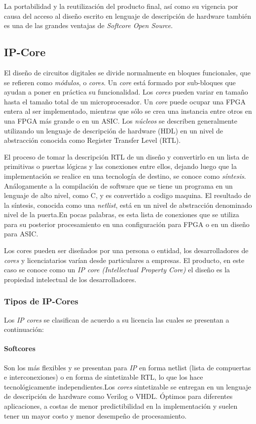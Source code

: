 	La portabilidad y la reutilización del producto final, así como su vigencia por causa del acceso al diseño escrito en lenguaje de descripción de
	hardware también es una de las grandes ventajas de \textit{Softcore Open Source}.

	\subsection{IP-Core}
	El diseño de circuitos digitales se divide normalmente en bloques funcionales, que se refieren como \textit{módulos}, o \textit{cores}. Un
	\textit{core} está formado por sub-bloques que ayudan a poner en práctica su funcionalidad. Los \textit{cores} pueden variar en tamaño hasta el
	tamaño total de un microprocesador. Un \textit{core} puede ocupar una FPGA entera al ser implementado, mientras que sólo se crea una instancia entre
	otros en una FPGA más grande o en un ASIC. Los \textit{núcleos} se describen generalmente utilizando un lenguaje de descripción de hardware (HDL) en
	un nivel de abstracción conocida como Register Transfer Level (RTL).
	
	El proceso de tomar la descripción RTL de un diseño y convertirlo en un lista de primitivas o puertas lógicas y las conexiones entre ellos, dejando
	luego que la  implementación se realice en una tecnología de destino, se conoce como \textit{síntesis}. Análogamente a la compilación de software	que
	se tiene un programa en un lenguaje de alto nivel, como C, y  es convertido a codigo maquina. El resultado de la síntesis, conocida como una
	\textit{netlist}, está en un nivel de abstracción denominado nivel de la puerta.En pocas palabras, es esta lista de conexiones que se utiliza para
	su posterior procesamiento en una configuración para FPGA o en un diseño para ASIC.
	
	Los cores pueden ser diseñados por una persona o entidad, los desarrolladores de \textit{cores} y licenciatarios varían desde particulares
	a empresas. El producto, en este caso se conoce como un \textit{IP core (Intellectual Property Core)} el diseño es la propiedad intelectual de los
	desarrolladores. 
	
		\subsubsection{Tipos de IP-Cores}

		Los \textit{IP cores} se clasifican de acuerdo a su licencia las cuales se presentan a continuación:
		
			\paragraph{Softcores}
			Son los más flexibles y se presentan para \textit{IP} en forma netlist (lista de compuertas e interconexiones) o en forma de sintetizable RTL, lo
			que los hace tecnológicamente independientes.Los \textit{cores} sintetizable se entregan en un lenguaje de descripción de hardware como Verilog o
			VHDL. Óptimos para diferentes aplicaciones, a costas de menor predictibilidad en la implementación y suelen tener un mayor costo y menor desempeño
			de procesamiento.

